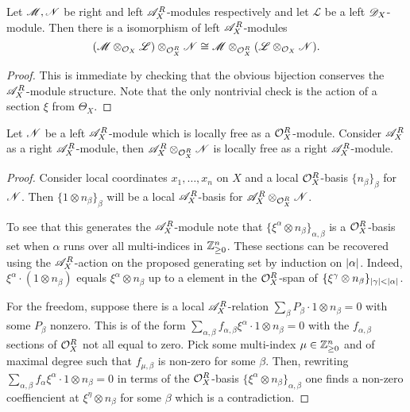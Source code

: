 \begin{lemma}\label{lem: IsomorphismTensors}
  Let $\mathscr{M}, \mathscr{N}$ be right and left $\mathscr{A}_X^R$-modules respectively and let $\mathscr{L}$ be a left $\mathscr{D}_X$-module. Then there is a isomorphism of left $\mathscr{A}_X^R$-modules
  $$(\mathscr{M} \otimes_{\mathcal{O}_X} \mathscr{L})\otimes_{\mathcal{O}_X^R} \mathscr{N} \cong \mathscr{M} \otimes_{\mathcal{O}_X^R} (\mathscr{L}\otimes_{\mathcal{O}_X} \mathscr{N}).   $$
\end{lemma}
\begin{proof}
  This is immediate by checking that the obvious bijection conserves the $\mathscr{A}_X^R$-module structure. Note that the only nontrivial check is the action of a section $\xi$ from $\Theta_X$.
\end{proof}
\begin{lemma}\label{lem: FreeLeftAModuleTensor}
  Let $\mathscr{N}$ be a left $\mathscr{A}_X^R$-module which is locally free as a $\mathcal{O}_X^R$-module. Consider $\mathscr{A}_X^R$ as a right $\mathscr{A}_X^R$-module, then $\mathscr{A}_X^R \otimes_{\mathcal{O}_X^R} \mathscr{N}$ is locally free as a right $\mathscr{A}_X^R$-module.
\end{lemma}
\begin{proof}
  Consider local coordinates $x_1,\ldots, x_n$ on $X$ and a local $\mathcal{O}_X^R$-basis $\{n_\beta\}_\beta$ for $\mathscr{N}$. Then $\{1\otimes n_\beta\}_{\beta}$ will be a local $\mathscr{A}_X^R$-basis for $\mathscr{A}_X^R \otimes_{\mathcal{O}_X^R} \mathscr{N}$.

  To see that this generates the $\mathscr{A}_X^R$-module note that $\{\xi^\alpha \otimes n_\beta\}_{\alpha,\beta}$
  is a $\mathcal{O}_X^R$-basis set when $\alpha$ runs over all multi-indices in $\mathbb{Z}_{\geq 0}^n$.
  These sections can be recovered using the $\mathscr{A}_X^R$-action on the proposed generating set by induction on $\vert \alpha \vert$.
  Indeed, $\xi^\alpha \cdot (1 \otimes n_\beta)$ equals $\xi^\alpha \otimes n_\beta$ up to a element in the $\mathcal{O}_X^R$-span of $\{\xi^\gamma \otimes n_\beta\}_{\vert \gamma \vert<\vert \alpha \vert}$.

  For the freedom, suppose there is a local $\mathscr{A}_X^R$-relation $\sum_\beta P_\beta \cdot 1\otimes n_\beta = 0$ with some $P_\beta$ nonzero. This is of the form $\sum_{\alpha, \beta} f_{\alpha,\beta} \xi^\alpha \cdot 1\otimes n_\beta = 0$ with the $f_{\alpha,\beta}$ sections of $\mathcal{O}_X^R$ not all equal to zero.
  Pick some multi-index $\mu\in \mathbb{Z}_{\geq 0}^n$ and of maximal degree such that $f_{\mu,\beta}$ is non-zero for some $\beta$.
  Then, rewriting $\sum_{\alpha, \beta} f_\alpha \xi^\alpha \cdot 1\otimes n_\beta = 0$ in terms of the $\mathcal{O}_X^R$-basis $\{\xi^\alpha \otimes n_\beta\}_{\alpha,\beta}$ one finds a non-zero coeffiencient at $\xi^\eta \otimes n_\beta$ for some $\beta$ which is a contradiction.
\end{proof}
